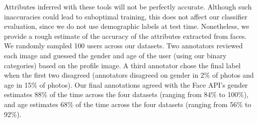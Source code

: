 Attributes inferred with these tools will not be perfectly accurate. 
Although such inaccuracies could lead to suboptimal training,
this does not affect our classifier evaluation,
since we do not use demographic labels at test time.
Nonetheless, we provide a rough estimate of the accuracy of the attributes extracted from faces.
We randomly sampled 100 users across our datasets.
Two annotators reviewed each image and guessed the gender and age of the user (using our binary categories) based on the profile image.
A third annotator chose the final label when the first two disagreed (annotators disagreed on gender in 2\% of photos and age in 15\% of photos).
Our final annotations agreed with the Face API's gender estimates 88\% of the time across the four datasets (ranging from 84\% to 100\%),
and age estimates 68\% of the time across the four datasets (ranging from 56\% to 92\%).



\begin{table}[t]
\centering
{}
\caption{Dataset statistics including user demographic distributions for four user factors.}
\label{tab:demographic}
\end{table}

